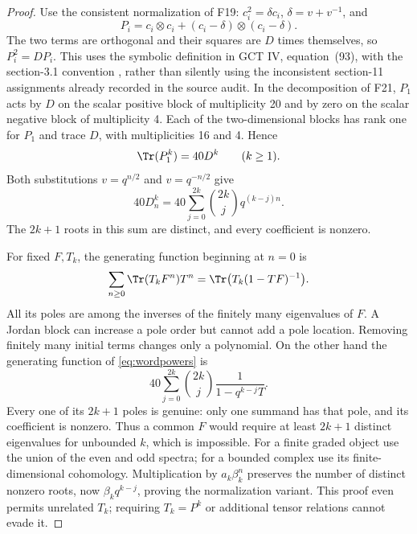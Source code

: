 \documentclass[11pt,a4paper]{article}
\renewcommand{\S}{\ensuremath{\mathsection}}
\newcommand{\fid}[1]{\textsf{#1}}\newcommand{\gate}[1]{\textsf{#1}}
\theoremstyle{named}\newtheorem{finding}{Finding}[section]
\theoremstyle{definition}\newtheorem{definition}[finding]{Definition}
\theoremstyle{remark}\newtheorem{remark}[finding]{Remark}
\begin{document}
\begin{proof}
Use the consistent normalization of \fid{F19}: $c_i^2=\delta c_i$,
$\delta=v+v^{-1}$, and
\[
 P_i=c_i\otimes c_i+(c_i-\delta)\otimes(c_i-\delta).
\]
The two terms are orthogonal and their squares are $D$ times
themselves, so $P_i^2=DP_i$. This uses the symbolic definition
in GCT IV, equation~(93), with the section-3.1 convention
\cite[\S3.1 and Definition~11.1, equation~(93)]{IV},
rather than silently using the inconsistent section-11
assignments already recorded in the source audit.
In the decomposition of \fid{F21}, $P_1$ acts by $D$ on
the scalar positive block of multiplicity 20 and by zero on
the scalar negative block of multiplicity 4. Each of the
two-dimensional blocks has rank one for $P_1$ and trace $D$,
with multiplicities 16 and 4. Hence
\[
 \Tr(P_1^k)=40D^k\qquad(k\ge1).
\]
Both substitutions $v=q^{n/2}$ and $v=q^{-n/2}$ give
\begin{equation}\label{eq:wordpowers}
 40D_n^k
   =40\sum_{j=0}^{2k}\binom{2k}{j}q^{(k-j)n}.
\end{equation}
The $2k+1$ roots in this sum are distinct, and every coefficient
is nonzero.

For fixed $F,T_k$, the generating function beginning at $n=0$ is
\[
 \sum_{n\ge0}\Tr(T_kF^n)T^n
   =\Tr\bigl(T_k(1-TF)^{-1}\bigr).
\]
All its poles are among the inverses of the finitely many
eigenvalues of $F$. A Jordan block can increase a pole order
but cannot add a pole location. Removing finitely many initial
terms changes only a polynomial. On the other hand the
generating function of \eqref{eq:wordpowers} is
\[
 40\sum_{j=0}^{2k}\binom{2k}{j}
      \frac{1}{1-q^{k-j}T}.
\]
Every one of its $2k+1$ poles is genuine: only one summand has
that pole, and its coefficient is nonzero. Thus a common $F$
would require at least $2k+1$ distinct eigenvalues for unbounded
$k$, which is impossible.
For a finite graded object use the union of the even and odd
spectra; for a bounded complex use its finite-dimensional
cohomology. Multiplication by $a_k\beta_k^n$ preserves the
number of distinct nonzero roots, now
$\beta_kq^{k-j}$, proving the normalization variant.
This proof even permits unrelated $T_k$; requiring
$T_k=P^k$ or additional tensor relations cannot evade it.


\end{proof}
\end{document}
